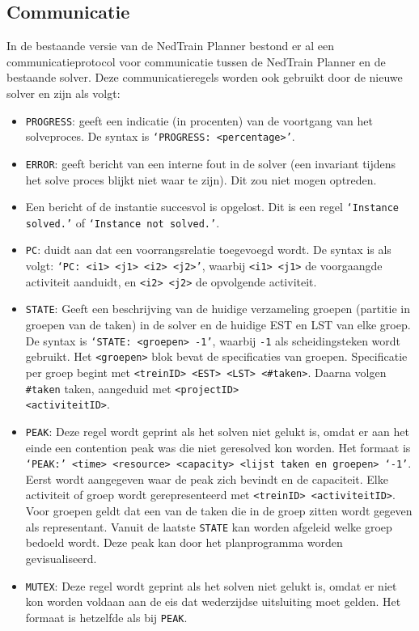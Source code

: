 \subsection{Communicatie}
In de bestaande versie van de NedTrain Planner bestond er al een communicatieprotocol voor communicatie tussen de NedTrain Planner en de bestaande solver. Deze communicatieregels worden ook gebruikt door de nieuwe solver \cite{bep2012nedtrain} en zijn als volgt:
\begin{itemize}
    \item \texttt{PROGRESS}: geeft een indicatie (in procenten) van de voortgang van het solveproces. De syntax is \texttt{\textquoteleft PROGRESS: <percentage>\textquoteright}.
    \item \texttt{ERROR}: geeft bericht van een interne fout in de solver (een invariant tijdens het solve proces blijkt niet waar te zijn). Dit zou niet mogen optreden.
    \item Een bericht of de instantie succesvol is opgelost. Dit is een regel \texttt{\textquoteleft Instance solved.\textquoteright} of \texttt{\textquoteleft Instance not solved.\textquoteright}.
    \item \texttt{PC}: duidt aan dat een voorrangsrelatie toegevoegd wordt. De syntax is als volgt: \texttt{\textquoteleft PC: <i1> <j1> <i2> <j2>\textquoteright}, waarbij \texttt{<i1> <j1>} de voorgaangde activiteit aanduidt, en \texttt{<i2> <j2>} de opvolgende activiteit.
    \item \texttt{STATE}: Geeft een beschrijving van de huidige verzameling groepen (partitie in groepen van de taken) in de solver en de huidige EST en LST van elke groep. De syntax is \texttt{\textquoteleft STATE: <groepen> -1\textquoteright}, waarbij \texttt{-1} als scheidingsteken wordt gebruikt. Het \texttt{<groepen>} blok bevat de specificaties van groepen. Specificatie per groep begint met \texttt{<treinID> <EST> <LST> <\#taken>}. Daarna volgen \texttt{\#taken} taken, aangeduid met \texttt{<projectID>} \\ \texttt{<activiteitID>}.
    \item \texttt{PEAK}: Deze regel wordt geprint als het solven niet gelukt is, omdat er aan het einde een contention peak was die niet geresolved kon worden. Het formaat is \texttt{\textquoteleft PEAK:\textquoteright \ <time> <resource> <capacity> <lijst taken en groepen> \textquoteleft -1\textquoteright}. Eerst wordt aangegeven waar de peak zich bevindt en de capaciteit. Elke activiteit of groep wordt gerepresenteerd met \texttt{<treinID> <activiteitID>}. Voor groepen geldt dat een van de taken die in de groep zitten wordt gegeven als representant. Vanuit de laatste \texttt{STATE} kan worden afgeleid welke groep bedoeld wordt. Deze peak kan door het planprogramma worden gevisualiseerd.
    \item \texttt{MUTEX}: Deze regel wordt geprint als het solven niet gelukt is, omdat er niet kon worden voldaan aan de eis dat wederzijdse uitsluiting moet gelden. Het formaat is hetzelfde als bij \texttt{PEAK}.
\end{itemize}

